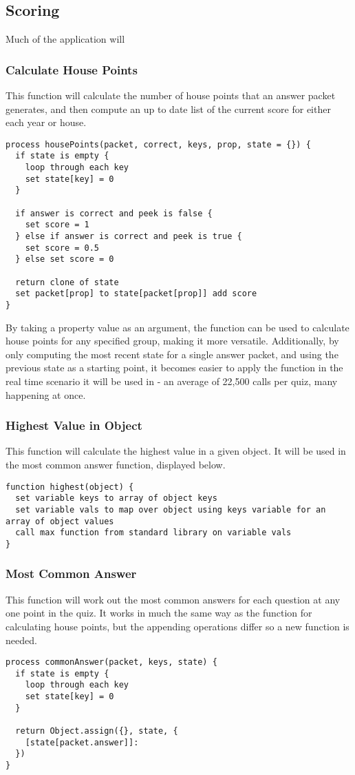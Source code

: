 \subsection{Scoring}
Much of the application will

\subsubsection{Calculate House Points}
This function will calculate the number of house points that an answer packet generates, and then compute an up to date list of the current score for either each year or house.
\begin{verbatim}
process housePoints(packet, correct, keys, prop, state = {}) {
  if state is empty {
    loop through each key
    set state[key] = 0
  }

  if answer is correct and peek is false {
    set score = 1
  } else if answer is correct and peek is true {
    set score = 0.5
  } else set score = 0

  return clone of state
  set packet[prop] to state[packet[prop]] add score
}
\end{verbatim}
By taking a property value as an argument, the function can be used to calculate house points for any specified group, making it more versatile. Additionally, by only computing the most recent state for a single answer packet, and using the previous state as a starting point, it becomes easier to apply the function in the real time scenario it will be used in - an average of 22,500 calls per quiz, many happening at once.

\subsubsection{Highest Value in Object}
This function will calculate the highest value in a given object. It will be used in the most common answer function, displayed below.
\begin{verbatim}
function highest(object) {
  set variable keys to array of object keys
  set variable vals to map over object using keys variable for an array of object values
  call max function from standard library on variable vals
}
\end{verbatim}

\subsubsection{Most Common Answer}
This function will work out the most common answers for each question at any one point in the quiz. It works in much the same way as the function for calculating house points, but the appending operations differ so a new function is needed.
\begin{verbatim}
process commonAnswer(packet, keys, state) {
  if state is empty {
    loop through each key
    set state[key] = 0
  }
  
  return Object.assign({}, state, {
    [state[packet.answer]]: 
  })
}
\end{verbatim}
